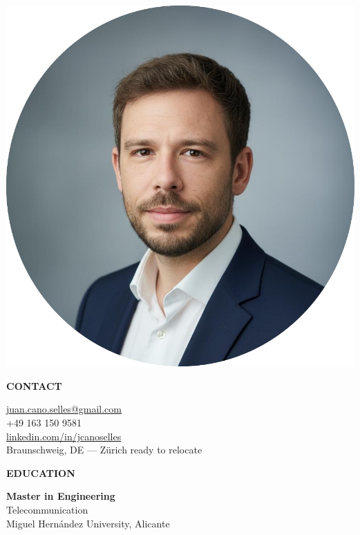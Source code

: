 \documentclass[12pt,a4paper]{article}
\newcommand{\headleft}[1]{%
  \vspace*{2ex}\textsc{\textbf{\color{softwhite}#1}}\par%
  \vspace*{-1.2ex}{\color{softwhite}\hrulefill}\par\vspace*{0.8ex}
}
\newlength{\SideBarW}
\begin{document}
\pagestyle{empty}\sloppy\setlength{\parindent}{0pt}\setlength{\parskip}{0pt}
\vspace*{-10mm}
\noindent\begin{minipage}[t]{\textwidth}

\colorbox{cvblue!90}{%
  \parbox[t][\textheight][t]{\SideBarW}{%
    \hspace*{4mm}\begin{minipage}[t]{\dimexpr\linewidth-8mm\relax}
      \color{softwhite}\vspace*{6mm}
      \begin{center}\includegraphics[width=0.85\linewidth]{Resume_Juan_Cano.png}\end{center}

      \headleft{CONTACT}
      \small
      \href{mailto:juan.cano.selles@gmail.com}{juan.cano.selles@gmail.com}\\[0.5ex]
      +49 163 150 9581\\[0.5ex]
      \href{https://www.linkedin.com/in/jcanoselles}{linkedin.com/in/jcanoselles}\\[0.5ex]
      Braunschweig, DE — Zürich ready to relocate
      \normalsize

      \vspace*{2.5mm}
      \headleft{EDUCATION}
      \textbf{Master in Engineering}\\[-0.2ex]
      Telecommunication\\[0.2ex]
      {\small Miguel Hernández University, Alicante}


\end{minipage}}}
\end{minipage}
\end{document}

